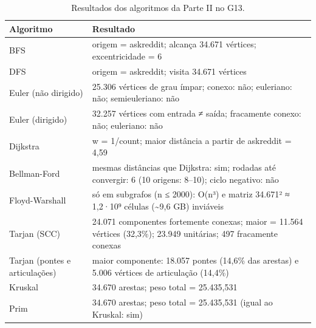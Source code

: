 \begin{table}[htbp]
\centering
\small
\caption{Resultados dos algoritmos da Parte II no G13.}
\label{tab:04_resultados_algoritmos}
\begin{tabular}{ll}
\toprule
Algoritmo & Resultado \\
\midrule
BFS & origem = askreddit; alcança 34.671 vértices; excentricidade = 6 \\
DFS & origem = askreddit; visita 34.671 vértices \\
Euler (não dirigido) & 25.306 vértices de grau ímpar; conexo: não; euleriano: não; semieuleriano: não \\
Euler (dirigido) & 32.257 vértices com entrada ≠ saída; fracamente conexo: não; euleriano: não \\
Dijkstra & w = 1/count; maior distância a partir de askreddit = 4,59 \\
Bellman-Ford & mesmas distâncias que Dijkstra: sim; rodadas até convergir: 6 (10 origens: 8–10); ciclo negativo: não \\
Floyd-Warshall & só em subgrafos (n ≤ 2000): O(n³) e matriz 34.671² ≈ 1,2·10⁹ células (\textasciitilde{}9,6 GB) inviáveis \\
Tarjan (SCC) & 24.071 componentes fortemente conexas; maior = 11.564 vértices (32,3\%); 23.949 unitárias; 497 fracamente conexas \\
Tarjan (pontes e articulações) & maior componente: 18.057 pontes (14,6\% das arestas) e 5.006 vértices de articulação (14,4\%) \\
Kruskal & 34.670 arestas; peso total = 25.435,531 \\
Prim & 34.670 arestas; peso total = 25.435,531 (igual ao Kruskal: sim) \\
\bottomrule
\end{tabular}
\end{table}
